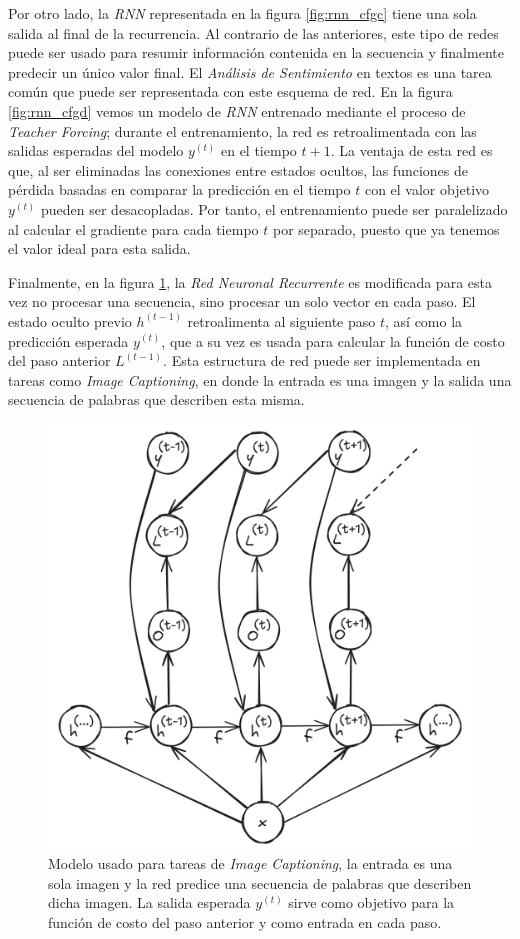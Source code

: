 Por otro lado, la \textit{RNN} representada en la figura \ref{fig:rnn_cfgc} tiene una sola salida al
final de la recurrencia. Al contrario de las anteriores, este tipo de redes puede ser usado para resumir
información contenida en la secuencia y finalmente predecir un único valor final.
El \textit{Análisis de Sentimiento} en textos es una tarea común que puede ser representada con este esquema
de red. En la figura \ref{fig:rnn_cfgd} vemos un modelo de \textit{RNN} entrenado mediante el proceso de
\textit{Teacher Forcing}; durante el entrenamiento, la red es retroalimentada con las salidas
esperadas del modelo $y^{(t)}$ en el tiempo $t+1$. La ventaja de esta red es que, al ser eliminadas
las conexiones entre estados ocultos, las funciones de pérdida basadas en comparar la predicción en
el tiempo $t$ con el valor objetivo $y^{(t)}$ pueden ser desacopladas. Por tanto, el entrenamiento
puede ser paralelizado al calcular el gradiente para cada tiempo $t$ por separado, puesto que ya
tenemos el valor ideal para esta salida.


Finalmente, en la figura \ref{fig:rnn_cfge}, la \textit{Red Neuronal Recurrente} es modificada para esta vez
no procesar una secuencia, sino procesar un solo vector en cada paso. El estado oculto
previo $h^{(t-1)}$ retroalimenta al siguiente paso $t$, así como la predicción esperada $y^{(t)}$, que
a su vez es usada para calcular la función de costo del paso anterior $L^{(t-1)}$. Esta estructura de
red puede ser implementada en tareas como \textit{Image Captioning}, en donde la entrada es una imagen y la salida
una secuencia de palabras que describen esta misma.


\begin{figure}[!ht]
\centering
\includegraphics[width=.4\textwidth]{Chapters/2. Transformer/Figures/rnn/rnn_cfge.png}
\caption{Modelo usado para tareas de \textit{Image Captioning}, la entrada es una
sola imagen y la red predice una secuencia de palabras que describen dicha imagen. La salida esperada
$y^{(t)}$ sirve como objetivo para la función de costo del paso anterior y como entrada en cada paso.}
\label{fig:rnn_cfge}
\end{figure}



